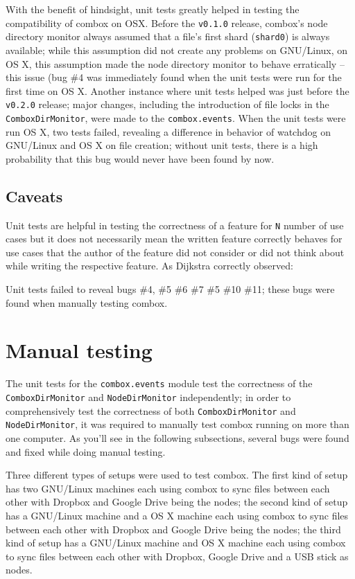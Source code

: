 With the benefit of hindsight, unit tests greatly helped in testing
the compatibility of combox on OSX. Before the \verb+v0.1.0+ release,
combox's node directory monitor always assumed that a file's first
shard (\verb+shard0+) is always available; while this assumption did
not create any problems on GNU/Linux, on OS X, this assumption made
the node directory monitor to behave erratically -- this issue (bug
\#4\cite{combox-issue-tracker} was immediately found when the unit
tests were run for the first time on OS X. Another instance where unit
tests helped was just before the \verb+v0.2.0+ release; major changes,
including the introduction of file locks in the
\verb+ComboxDirMonitor+, were made to the \verb+combox.events+. When
the unit tests were run OS X, two tests failed, revealing a difference
in behavior of watchdog\cite{pylib:watchdog} on GNU/Linux and OS X on
file creation\cite{combox-wd-fix}; without unit tests, there is a high
probability that this bug would never have been found by now.

\subsection{Caveats}

Unit tests are helpful in testing the correctness of a feature for
\verb+N+ number of use cases but it does not necessarily mean the
written feature correctly behaves for use cases that the author of the
feature did not consider or did not think about while writing the
respective feature. As Dijkstra correctly observed:

Unit tests failed to reveal bugs \#4, \#5 \#6 \#7 \#5 \#10
\#11\cite{combox-issue-tracker}; these bugs were found when manually
testing combox.

\section{Manual testing}

The unit tests for the \verb+combox.events+ module test the
correctness of the \verb+ComboxDirMonitor+ and \verb+NodeDirMonitor+
independently; in order to comprehensively test the correctness of
both \verb+ComboxDirMonitor+ and \verb+NodeDirMonitor+, it was
required to manually test combox running on more than one computer. As
you'll see in the following subsections, several bugs were found and
fixed while doing manual testing.

Three different types of setups were used to test combox. The first
kind of setup has two GNU/Linux machines each using combox to sync
files between each other with Dropbox and Google Drive being the
nodes; the second kind of setup has a GNU/Linux machine and a OS X
machine each using combox to sync files between each other with
Dropbox and Google Drive being the nodes; the third kind of setup has
a GNU/Linux machine and OS X machine each using combox to sync files
between each other with Dropbox, Google Drive and a USB stick as
nodes.

